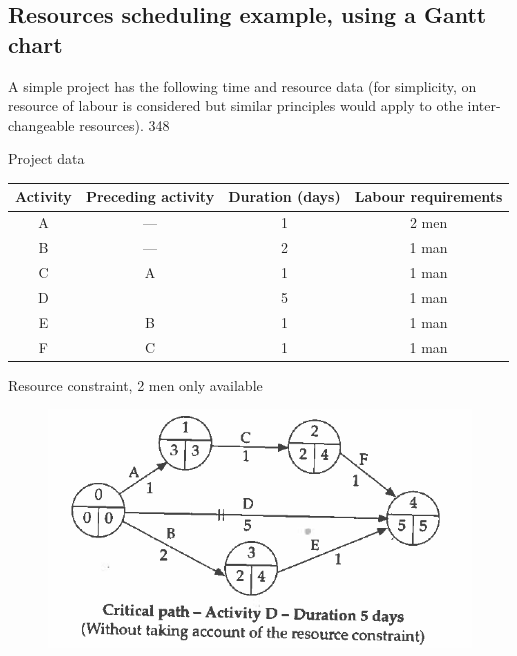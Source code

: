 \documentclass[]{report}
\begin{document}
	\subsection*{Resources scheduling example, using a Gantt chart} A simple project has the following time and resource data (for simplicity, on resource of labour is considered but similar principles would apply to othe inter-changeable resources). 
	348 
	
	
	
	
	Project data 
	\begin{tabular}{cccc}
		Activity  & Preceding activity &  Duration (days) & Labour requirements \\ \hline 
		A & — & 1 &  2 men \\ \hline 
		B & — & 2 & 1 man  \\ \hline 
		C & A & 1 & 1 man \\ \hline 
		D &   & 5 & 1 man \\ \hline 
		E & B & 1 & 1 man \\ \hline 
		F & C & 1 & 1 man \\ \hline 
	\end{tabular}
	
	Resource constraint, 2 men only available 
	\begin{figure}[h!]
\centering
\includegraphics[width=0.4\linewidth]{images4/349-a}
\caption{}
\label{fig:349-a}
\end{figure}
\end{document}
